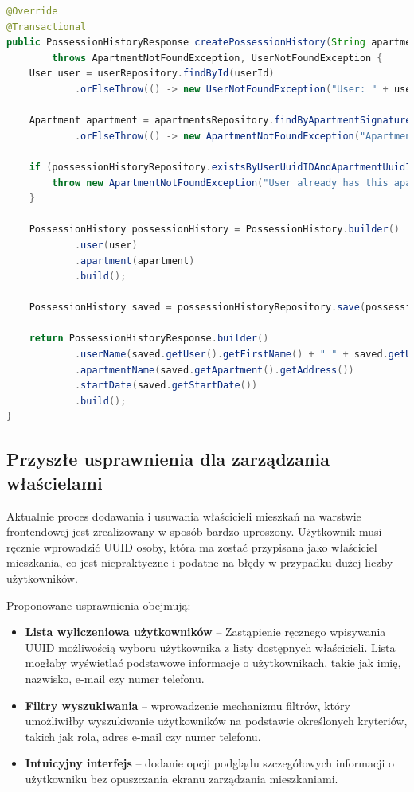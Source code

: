 \begin{lstlisting}[language=Java, style=JavaStyle, caption=Przypisywanie właścicieli w \texttt{ApartmentsServiceImp}]
@Override
@Transactional
public PossessionHistoryResponse createPossessionHistory(String apartmentSignature, UUID userId)
        throws ApartmentNotFoundException, UserNotFoundException {
    User user = userRepository.findById(userId)
            .orElseThrow(() -> new UserNotFoundException("User: " + userId + " not found"));

    Apartment apartment = apartmentsRepository.findByApartmentSignature(apartmentSignature)
            .orElseThrow(() -> new ApartmentNotFoundException("Apartment with signature: " + apartmentSignature + " not found"));

    if (possessionHistoryRepository.existsByUserUuidIDAndApartmentUuidID(userId, apartment.getUuidID())) {
        throw new ApartmentNotFoundException("User already has this apartment assigned");
    }

    PossessionHistory possessionHistory = PossessionHistory.builder()
            .user(user)
            .apartment(apartment)
            .build();

    PossessionHistory saved = possessionHistoryRepository.save(possessionHistory);

    return PossessionHistoryResponse.builder()
            .userName(saved.getUser().getFirstName() + " " + saved.getUser().getLastName())
            .apartmentName(saved.getApartment().getAddress())
            .startDate(saved.getStartDate())
            .build();
}
\end{lstlisting}

\subsection{Przyszłe usprawnienia dla zarządzania właścielami}

Aktualnie proces dodawania i usuwania właścicieli mieszkań na warstwie frontendowej jest zrealizowany w sposób bardzo uproszony. Użytkownik musi ręcznie wprowadzić UUID osoby, która ma zostać przypisana jako właściciel mieszkania, co jest niepraktyczne i podatne na błędy w przypadku dużej liczby użytkowników.

Proponowane usprawnienia obejmują:

\begin{itemize}
    \item \textbf{Lista wyliczeniowa użytkowników} -- Zastąpienie ręcznego wpisywania UUID możliwością wyboru użytkownika z listy dostępnych właścicieli. Lista mogłaby wyświetlać podstawowe informacje o użytkownikach, takie jak imię, nazwisko, e-mail czy numer telefonu.
    \item \textbf{Filtry wyszukiwania} -- wprowadzenie mechanizmu filtrów, który umożliwiłby wyszukiwanie użytkowników na podstawie określonych kryteriów, takich jak rola, adres e-mail czy numer telefonu.
    \item \textbf{Intuicyjny interfejs} -- dodanie opcji podglądu szczegółowych informacji o użytkowniku bez opuszczania ekranu zarządzania mieszkaniami.
\end{itemize}

